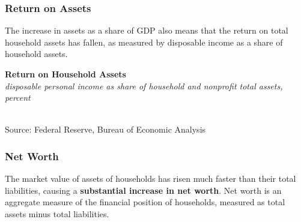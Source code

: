 \documentclass{report}
\makeatletter
\newcommand{\tbllink}[1]{\href{https://raw.githubusercontent.com/bdecon/US-chartbook/master/chartbook/data/#1}{\faTable}}
\newcommand*\short[1]{\expandafter\@gobbletwo\number\numexpr#1\relax}
\newcommand{\dateaxisticks}{
		date coordinates in=x, axis line style={draw=none},
		xmax={2020-05-10},
		max space between ticks=40,	    
		xtick={{1990-01-01}, {1992-01-01}, {1994-01-01}, 
			{1996-01-01}, {1998-01-01}, {2000-01-01}, 
			{2002-01-01}, {2004-01-01}, {2006-01-01},
			{2008-01-01}, {2010-01-01}, {2012-01-01}, {2014-01-01},
		    {2016-01-01}, {2018-01-01}, {2020-01-01}},
		minor xtick={{1989-01-01}, {1991-01-01}, {1993-01-01},
			{1995-01-01}, {1997-01-01}, {1999-01-01}, 
			{2001-01-01}, {2003-01-01}, {2005-01-01}, {2007-01-01},
		    {2009-01-01}, {2011-01-01}, {2013-01-01}, {2015-01-01},
		    {2017-01-01}, {2019-01-01}},
		enlarge y limits={0.06}, enlarge x limits={0.01},
		}
\newcommand{\bbar}[2]{extra #1 ticks = {{#2}}, extra #1 tick labels = ,
		extra #1 tick style = {grid=major, grid style={thick, black!25}},}
\newcommand{\stdline}[4]{\addplot[very thick, no markers, color=#1] 
		table [x=#2, y=#3, col sep=comma] {#4};	}
\newcommand{\rbars}{
		\fill[color=black!10] (axis cs:{1990-07-01},\pgfkeysvalueof{/pgfplots/ymin}) rectangle 
			(axis cs:{1991-03-01}, \pgfkeysvalueof{/pgfplots/ymax});
		\fill[color=black!10] (axis cs:{2007-12-01},\pgfkeysvalueof{/pgfplots/ymin}) rectangle 
			(axis cs:{2009-07-01}, \pgfkeysvalueof{/pgfplots/ymax});
		\fill[color=black!10] (axis cs:{2001-03-01},\pgfkeysvalueof{/pgfplots/ymin}) rectangle 
			(axis cs:{2001-11-01}, \pgfkeysvalueof{/pgfplots/ymax});}
\makeatother
\begin{document}
{{{{\begin{minipage}{0.76\textwidth}
\vspace{8mm}

\subsubsection*{\color{black!70} \seriffont Return on Assets}

\small The increase in assets as a share of GDP also means that the return on total household assets has fallen, as measured by disposable income as a share of household assets.  \\ 

\vspace{2mm}

\noindent \normalsize \textbf{Return on Household Assets}\\
\footnotesize{\textit{disposable personal income as share of household and nonprofit total assets, percent}}\\
\noindent \hspace*{-2mm} \\
\footnotesize{Source: Federal Reserve, Bureau of Economic Analysis} \hfill \tbllink{dpish.csv}


\end{minipage}

\newpage

\begin{minipage}{0.76\textwidth}

\subsubsection*{\color{black!70} \seriffont Net Worth}

\small The market value of assets of households has risen much faster than their total liabilities, causing a \textbf{substantial increase in net worth}. Net worth is an aggregate measure of the financial position of households, measured as total assets minus total liabilities.  \\


\\


\end{minipage}}}}}
\end{document}
